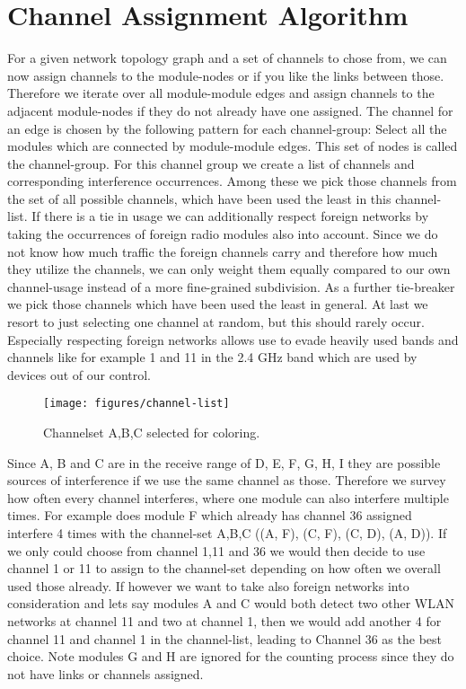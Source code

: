   \section{Channel Assignment Algorithm}
    For a given network topology graph and a set of channels to chose from, we can now assign channels to the module-nodes or if you like the links
    between those. Therefore we iterate over all module-module edges and assign channels to the adjacent module-nodes if they do not already have one assigned.
    The channel for an edge is chosen by the following pattern for each channel-group:
    Select all the modules which are connected by module-module edges. This set of nodes is called the channel-group.
    For this channel group we create a list of channels and corresponding interference occurrences.
    Among these we pick those channels from the set of all possible channels, which have been used the least in this channel-list. If there is a tie in usage
    we can additionally respect foreign networks by taking the occurrences of foreign radio modules also into account. Since we do not know how much traffic the foreign 
    channels carry and therefore how much they utilize the channels, we can only weight them equally compared to our own channel-usage instead of a more fine-grained subdivision.
    As a further tie-breaker we pick those channels which have been used the least in general.
    At last we resort to just selecting one channel at random, but this should rarely occur.
    Especially respecting foreign networks allows use to evade heavily used bands and channels like for example 1 and 11 in the 2.4 GHz band which 
    are used by devices out of our control.
    
    \begin{figure}[h!]
      \centering
      \texttt{[image: figures/channel-list]}
      \caption{Channelset A,B,C selected for coloring.}
      \label{fig:channel-list}
    \end{figure}
    
\newpage
    
    Since A, B and C are in the receive range of D, E, F, G, H, I they are possible sources of interference if we use the same channel as those. 
    Therefore we survey how often every channel interferes, where one module can also interfere multiple times.
    For example does module F which already has channel 36 assigned interfere 4 times with the channel-set A,B,C ((A, F), (C, F), (C, D), (A, D)). 
    If we only could choose from channel 1,11 and 36 we would then decide to use
    channel 1 or 11 to assign to the channel-set depending on how often we overall used those already.
    If however we want to take also foreign networks into consideration and lets say modules A and C would both detect two other \ac{WLAN} networks at channel 11 and two
    at channel 1, then we would add another 4 for channel 11 and channel 1 in the channel-list, leading to Channel 36 as the best choice. 
    Note modules G and H are ignored for the counting process since they do not have links or channels assigned.
    
